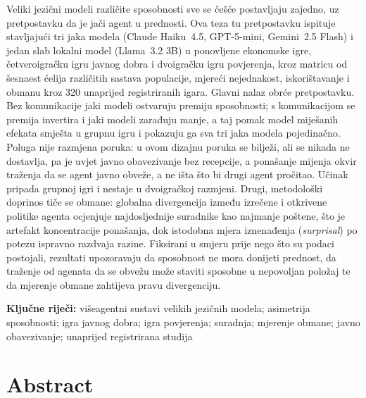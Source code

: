 Veliki jezični modeli različite sposobnosti sve se češće postavljaju zajedno, uz pretpostavku da
je jači agent u prednosti. Ova teza tu pretpostavku ispituje stavljajući tri jaka modela
(Claude Haiku~4.5, GPT-5-mini, Gemini~2.5 Flash) i jedan slab lokalni model (Llama~3.2 3B) u
ponovljene ekonomske igre, četveroigračku igru javnog dobra i dvoigračku igru povjerenja, kroz
matricu od šesnaest ćelija različitih sastava populacije, mjereći nejednakost, iskorištavanje i
obmanu kroz 320 unaprijed registriranih igara. Glavni nalaz obrće pretpostavku. Bez komunikacije
jaki modeli ostvaruju premiju sposobnosti; s komunikacijom se premija invertira i jaki modeli
zarađuju manje, a taj pomak model miješanih efekata smješta u grupnu igru i pokazuju ga sva tri
jaka modela pojedinačno. Poluga nije razmjena poruka: u ovom dizajnu poruka se bilježi, ali se
nikada ne dostavlja, pa je uvjet javno obavezivanje bez recepcije, a ponašanje mijenja okvir
traženja da se agent javno obveže, a ne išta što bi drugi agent pročitao. Učinak pripada grupnoj
igri i nestaje u dvoigračkoj razmjeni. Drugi, metodološki doprinos tiče se obmane: globalna
divergencija između izrečene i otkrivene politike agenta ocjenjuje najdosljednije suradnike kao
najmanje poštene, što je artefakt koncentracije ponašanja, dok istodobna mjera iznenađenja
(\textit{surprisal}) po potezu ispravno razdvaja razine. Fiksirani u smjeru prije nego što su
podaci postojali, rezultati upozoravaju da sposobnost ne mora donijeti prednost, da traženje od
agenata da se obvežu može staviti sposobne u nepovoljan položaj te da mjerenje obmane zahtijeva
pravu divergenciju.

\vspace{1em}\noindent\textbf{Ključne riječi:} višeagentni sustavi velikih jezičnih modela;
asimetrija sposobnosti; igra javnog dobra; igra povjerenja; suradnja; mjerenje obmane; javno
obavezivanje; unaprijed registrirana studija

\chapter*{Abstract}

